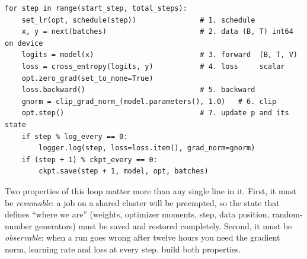 \begin{lstlisting}[caption={The skeleton every training loop in this book follows.},label={lst:optim:skeleton}]
for step in range(start_step, total_steps):
    set_lr(opt, schedule(step))               # 1. schedule
    x, y = next(batches)                      # 2. data (B, T) int64 on device
    logits = model(x)                         # 3. forward  (B, T, V)
    loss = cross_entropy(logits, y)           # 4. loss     scalar
    opt.zero_grad(set_to_none=True)
    loss.backward()                           # 5. backward
    gnorm = clip_grad_norm_(model.parameters(), 1.0)   # 6. clip
    opt.step()                                # 7. update p and its state
    if step % log_every == 0:
        logger.log(step, loss=loss.item(), grad_norm=gnorm)
    if (step + 1) % ckpt_every == 0:
        ckpt.save(step + 1, model, opt, batches)
\end{lstlisting}

Two properties of this loop matter more than any single line in it. First, it must be
\emph{resumable}: a job on a shared cluster will be preempted, so the state that defines
``where we are'' (weights, optimizer moments, step, data position, random-number generators)
must be saved and restored completely. Second, it must be \emph{observable}: when a run goes
wrong after twelve hours you need the gradient norm, learning rate and loss at every step.
 build both properties.

